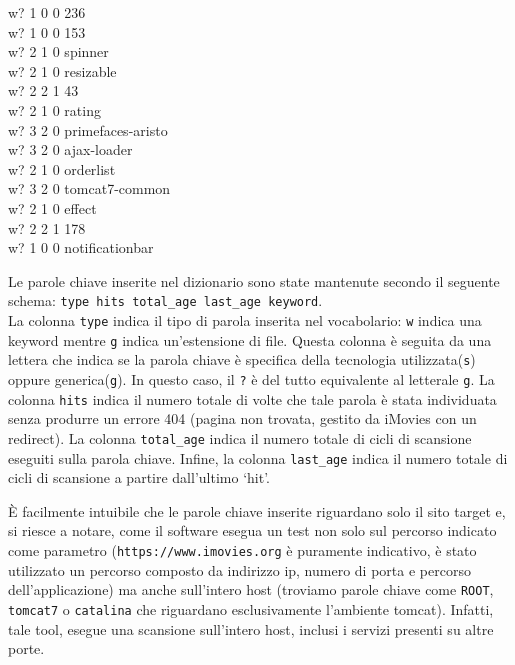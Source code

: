 \documentclass{article}
\begin{document}
\begin{itemize}
\begin{small}
\begin{minipage}{0.47\textwidth}
w? 1 0 0 236\\
w? 1 0 0 153\\
w? 2 1 0 spinner\\
w? 2 1 0 resizable\\
w? 2 2 1 43\\
w? 2 1 0 rating\\
w? 3 2 0 primefaces-aristo\\
w? 3 2 0 ajax-loader\\
w? 2 1 0 orderlist\\
w? 3 2 0 tomcat7-common\\
w? 2 1 0 effect\\
w? 2 2 1 178\\
w? 1 0 0 notificationbar\\
\end{minipage}
\end{small} 

Le parole chiave inserite nel dizionario sono state mantenute secondo il seguente schema: {\tt type hits total\_age last\_age keyword}.\\
La colonna {\tt type} indica il tipo di parola inserita nel vocabolario: {\tt w} indica una keyword mentre {\tt g} indica un'estensione di file. Questa colonna è seguita da una lettera che indica se la parola chiave è specifica della tecnologia utilizzata({\tt s}) oppure generica({\tt g}).
In questo caso, il {\tt ?} è del tutto equivalente al letterale {\tt g}.
La colonna {\tt hits} indica il numero totale di volte che tale parola è stata individuata senza produrre un errore 404 (pagina non trovata, gestito da iMovies con un redirect).
La colonna {\tt total\_age} indica il numero totale di cicli di scansione eseguiti sulla parola chiave.
Infine, la colonna {\tt last\_age} indica il numero totale di cicli di scansione a partire dall'ultimo `hit'.

\`E facilmente intuibile che le parole chiave inserite riguardano solo il sito target e, si riesce a notare, come il software esegua un test non solo sul percorso indicato come parametro ({\tt https://www.imovies.org} è puramente indicativo, è stato utilizzato un percorso composto da indirizzo ip, numero di porta e percorso dell'applicazione) ma anche sull'intero host (troviamo parole chiave come {\tt ROOT}, {\tt tomcat7} o {\tt catalina} che riguardano esclusivamente l'ambiente tomcat). Infatti, tale tool, esegue una scansione sull'intero host, inclusi i servizi presenti su altre porte.


\end{itemize}
\end{document}
